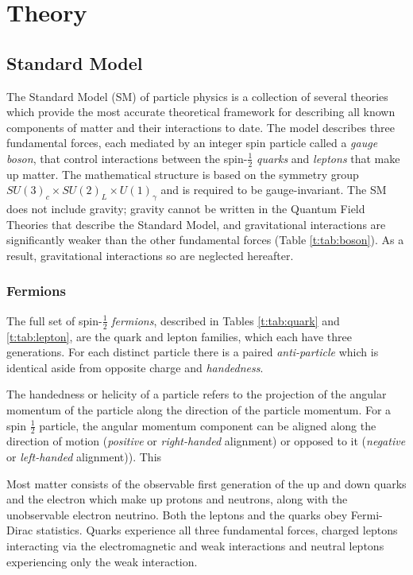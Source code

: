 \chapter{Theory}\label{c:Theory}

\section{Standard Model}


The Standard Model (SM) of particle physics is a collection of several theories which provide the most accurate theoretical framework for describing all known components of matter and their interactions to date. The model describes three fundamental forces, each mediated by an integer spin particle called a \textit{gauge boson}, that control interactions between the spin-$\frac{1}{2}$ \textit{quarks} and \textit{leptons} that make up matter. The mathematical structure is  based on the symmetry group $SU(3)_c\times SU(2)_L\times U(1)_\gamma$ and is required to be gauge-invariant. The SM does not include gravity; gravity cannot be written in the Quantum Field Theories that describe the Standard Model, and gravitational interactions are significantly weaker than the other fundamental forces (Table \ref{t:tab:boson}). As a result, gravitational interactions so are neglected hereafter.

	\subsection{Fermions}

		The full set of spin-$\frac{1}{2}$ \textit{fermions}, described in Tables \ref{t:tab:quark} and \ref{t:tab:lepton}, are the quark and lepton families, which each have three generations. For each distinct particle there is a paired \textit{anti-particle} which is identical aside from opposite charge and \textit{handedness}.

		The handedness or helicity of a particle refers to the projection of the angular momentum of the particle along the direction of the particle momentum. For a spin $\frac{1}{2}$ particle, the angular momentum component can be aligned along the direction of motion (\textit{positive} or \textit{right-handed} alignment) or opposed to it (\textit{negative} or \textit{left-handed} alignment)). This

		Most matter consists of the observable first generation of the up and down quarks and the electron which make up protons and neutrons, along with the unobservable electron neutrino. Both the leptons and the quarks obey Fermi-Dirac statistics. Quarks experience all three fundamental forces, charged leptons interacting via the electromagnetic and weak interactions and neutral leptons experiencing only the weak interaction.

